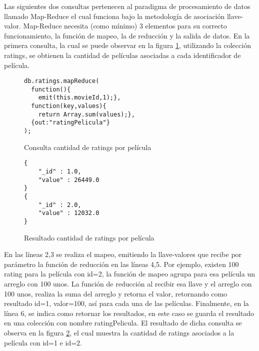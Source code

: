 \documentclass[conference,compsoc]{sty/IEEEtran}
\begin{document}
Las siguientes dos consultas pertenecen al paradigma de procesamiento de datos llamado Map-Reduce el cual funciona bajo la metodología de asociación llave-valor. Map-Reduce necesita (como mínimo) 3 elementos para su correcto funcionamiento, la función de mapeo, la de reducción y la salida de datos. En la primera consulta, la cual se puede observar en la figura \ref{fig:ConCantidadRatings}, utilizando la colección ratings, se obtienen la cantidad de películas asociadas a cada identificador de película.
\begin{figure}
    \begin{verbatim}
db.ratings.mapReduce(
  function(){   
    emit(this.movieId,1);},
  function(key,values){
    return Array.sum(values);},
  {out:"ratingPelicula"}
);
\end{verbatim}
\caption{Consulta cantidad de ratings por película} 
\label{fig:ConCantidadRatings}
\end{figure}

\begin{figure}
    \begin{verbatim}
{
	"_id" : 1.0,
	"value" : 26449.0
}
{
	"_id" : 2.0,
	"value" : 12032.0
}
\end{verbatim}
\caption{Resultado cantidad de ratings por película} 
\label{fig:ResCantidadRatings}
\end{figure}

En las líneas 2,3 se realiza el mapeo, emitiendo la llave-valores que recibe por parámetro la función de reducción en las líneas 4,5. Por ejemplo, existen 100 rating para la película con id=2, la función de mapeo agrupa para esa película un arreglo con 100 unos. La función de reducción al recibir esa llave y el arreglo con 100 unos, realiza la suma del arreglo y retorna el valor, retornando como resultado id=1, valor=100, así para cada una de las películas. Finalmente, en la línea 6, se indica como retornar los resultados, en este caso se guarda el resultado en una colección con nombre ratingPelicula. El resultado de dicha consulta se observa en la figura \ref{fig:ResCantidadRatings}, el cual muestra la cantidad de ratings asociados a la película con id=1 e id=2. 
\end{document}
